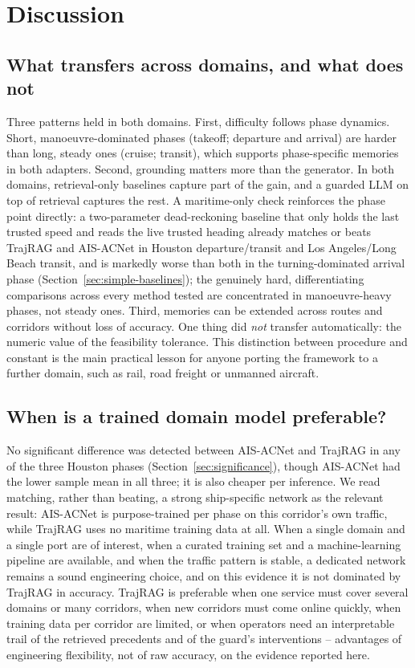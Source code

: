 \section{Discussion}
\label{sec:discussion}

\subsection{What transfers across domains, and what does not}

Three patterns held in both domains. First, difficulty follows phase
dynamics. Short, manoeuvre-dominated phases (takeoff; departure and arrival)
are harder than long, steady ones (cruise; transit), which supports
phase-specific memories in both adapters. Second, grounding matters more
than the generator. In both domains, retrieval-only baselines capture part
of the gain, and a guarded LLM on top of retrieval captures the rest. A
maritime-only check reinforces the phase point directly: a two-parameter
dead-reckoning baseline that only holds the last trusted speed and reads
the live trusted heading already matches or beats TrajRAG and AIS-ACNet in
Houston departure/transit and Los Angeles/Long Beach transit, and is
markedly worse than both in the turning-dominated arrival phase
(Section~\ref{sec:simple-baselines}); the genuinely hard, differentiating
comparisons across every method tested are concentrated in manoeuvre-heavy
phases, not steady ones. Third,
memories can be extended across routes and corridors without loss of
accuracy. One thing did \emph{not} transfer automatically: the numeric value
of the feasibility tolerance. This distinction between procedure and
constant is the main practical lesson for anyone porting the framework to a
further domain, such as rail, road freight or unmanned aircraft.

\subsection{When is a trained domain model preferable?}

No significant difference was detected between AIS-ACNet and TrajRAG in any
of the three Houston phases (Section~\ref{sec:significance}), though
AIS-ACNet had the lower sample mean in all three; it is also cheaper per
inference. We read matching, rather than beating, a strong ship-specific
network as the relevant result: AIS-ACNet is purpose-trained per phase on
this corridor's own traffic, while TrajRAG uses no maritime training data
at all. When a single domain and a single port are of interest, when a
curated training set and a machine-learning pipeline are available, and when
the traffic pattern is stable, a dedicated network remains a sound
engineering choice, and on this evidence it is not dominated by TrajRAG in
accuracy. TrajRAG is preferable when one service must cover several domains
or many corridors, when new corridors must come online quickly, when
training data per corridor are limited, or when operators need an
interpretable trail of the retrieved precedents and of the guard's
interventions -- advantages of engineering flexibility, not of raw
accuracy, on the evidence reported here.

